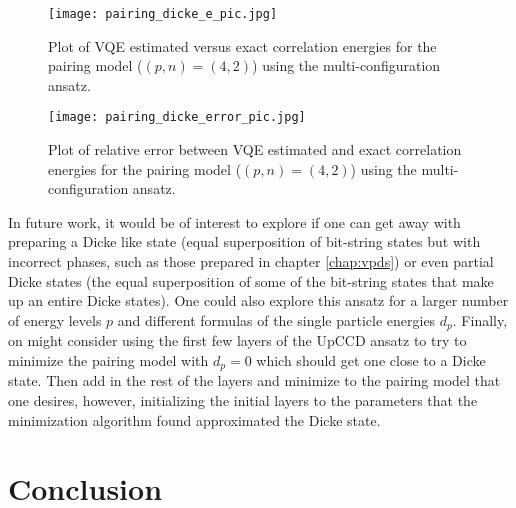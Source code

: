 \documentclass[Dual]{msu-thesis}
\begin{document}
\begin{figure}
    \centering
    \texttt{[image: pairing\_dicke\_e\_pic.jpg]}
    \caption{Plot of VQE estimated versus exact correlation energies for the pairing model ($(p,n)=(4,2)$) using the multi-configuration ansatz.}
    \label{fig:pairing_dicke_e_pic}
\end{figure}

\begin{figure}
    \centering
    \texttt{[image: pairing\_dicke\_error\_pic.jpg]}
    \caption{Plot of relative error between VQE estimated and exact correlation energies for the pairing model ($(p,n)=(4,2)$) using the multi-configuration ansatz.}
    \label{fig:pairing_dicke_error_pic}
\end{figure}

In future work, it would be of interest to explore if one can get away with preparing a Dicke like state (equal superposition of bit-string states but with incorrect phases, such as those prepared in chapter \ref{chap:vpds}) or even partial Dicke states (the equal superposition of some of the bit-string states that make up an entire Dicke states). One could also explore this ansatz for a larger number of energy levels $p$ and different formulas of the single particle energies $d_p$. Finally, on might consider using the first few layers of the UpCCD ansatz to try to minimize the pairing model with $d_p=0$ which should get one close to a Dicke state. Then add in the rest of the layers and minimize to the pairing model that one desires, however, initializing the initial layers to the parameters that the minimization algorithm found approximated the Dicke state. 

\section{Conclusion}
\end{document}
